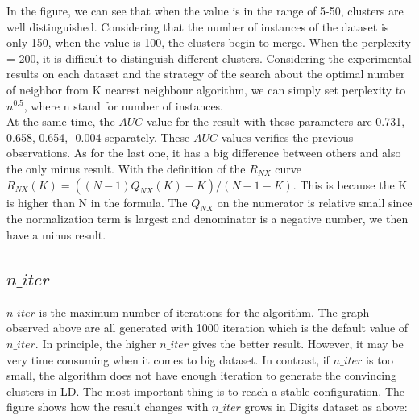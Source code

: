\noindent In the figure, we can see that when the value is in the range of 5-50, clusters are well distinguished. Considering that the number of instances of the dataset is only 150, when the value is 100, the clusters begin to merge. When the perplexity = 200, it is difficult to distinguish different clusters. Considering the experimental results on each dataset and the strategy of the search about the optimal number of neighbor from K nearest neighbour algorithm\cite{ref12}, we can simply set perplexity to $n^{0.5}$, where n stand for number of instances. \\

\noindent At the same time, the $AUC$ value for the result with these parameters are 0.731, 0.658, 0.654, -0.004 separately. These $AUC$ values verifies the previous observations. As for the last one, it has a big difference between others and also the only minus result. With the definition of the $R_{NX}$ curve $R_{NX} (K) = ((N − 1)Q_{NX} (K) − K) /(N − 1 − K)$. This is because the K is higher than N in the formula. The $Q_{NX}$ on the numerator is relative small since the normalization term is largest and denominator is a negative number, we then have a minus result.

\subsection{$n\_iter$}

\noindent $n\_iter$ is the maximum number of iterations for the algorithm. The graph observed above are all generated with 1000 iteration which is the default value of $n\_iter$. In principle, the higher $n\_iter$ gives the better result. However, it may be very time consuming when it comes to big dataset. In contrast, if $n\_iter$ is too small, the algorithm does not have enough iteration to generate the convincing clusters in LD. The most important thing is to reach a stable configuration. The figure shows how the result changes with $n\_iter$ grows in Digits dataset as above:

